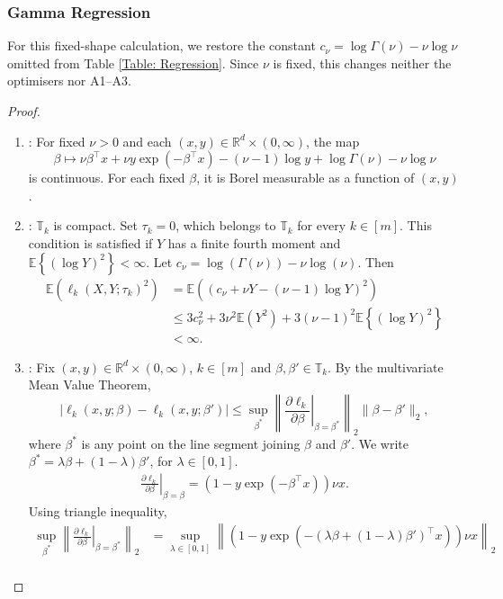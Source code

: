\documentclass[12pt]{article}
\newcommand{\blue}[1]{\textcolor[rgb]{0.00,0.00,1.00}{#1}}
\theoremstyle{remark}
\theoremstyle{plain}
\begin{document}
\subsubsection{Gamma Regression}
\blue{For this fixed-shape calculation, we restore the constant $c_\nu=\log\Gamma(\nu)-\nu\log\nu$ omitted from Table \ref{Table: Regression}. Since $\nu$ is fixed, this changes neither the optimisers nor A1--A3.}
\begin{proof}
    \begin{enumerate}
    \item[A1]: For fixed $\nu>0$ and each $(x,y)\in\mathbb R^d\times(0,\infty)$, the map
    \[
    \beta\mapsto \nu\beta^\top x+\nu y\exp(-\beta^\top x)
    -(\nu-1)\log y+\log\Gamma(\nu)-\nu\log\nu
    \]
    is continuous. For each fixed $\beta$, it is Borel measurable as a function of $(x,y)$.
    \item[A2]: $\mathbb{T}_k$ is compact. Set $\tau_k=0$, which belongs to $\mathbb{T}_k$ for every $k\in[m]$. This condition is satisfied if $Y$ has a finite fourth moment and $\mathbb{E}\left\{\left(\log Y\right)^2\right\} < \infty$. Let $c_\nu = \log(\Gamma(\nu)) - \nu\log(\nu)$. Then
    \begin{align*}
        \mathbb{E}\left(\ell_k(X, Y; \tau_k)^2\right) &= \mathbb{E}\left(\left(c_\nu + \nu Y - (\nu - 1)\log Y \right)^2\right)\\
        &\leq 3c_\nu^2 + 3\nu^2\mathbb{E}\left(Y^2\right) + 3(\nu - 1)^2\mathbb{E}\left\{\left(\log Y\right)^2\right\}\\
        &< \infty.
    \end{align*}
    \item[A3]: Fix \blue{$(x,y)\in \mathbb R^d\times(0,\infty)$}, $k \in \left[m\right]$ and $\beta, \beta'\in \mathbb{T}_k$. By the multivariate Mean Value Theorem,
    \[|\ell_k(x, y; \beta) - \ell_k(x, y; \beta')| \leq \sup_{\beta^*} \left\lVert \left. \frac{\partial \ell_k}{\partial \beta}\right|_{\beta = \beta^*} \right \rVert_2 \lVert \beta - \beta'\rVert_2, \]
    where $\beta^*$ is any point on the line segment joining $\beta$ and $\beta'$. We write $\beta^* = \lambda\beta + (1 - \lambda)\beta'$, for $\lambda\in\left[0, 1\right]$.
    \begin{align*}
        \left.\frac{\partial \ell_k}{\partial \beta}\right|_{\beta=\beta} = \left(1 - y\exp(-\beta^\top x)\right)\nu x.
    \end{align*}
    Using triangle inequality,
    \begin{align*}
        \sup_{\beta^*} \left\lVert \left. \frac{\partial \ell_k}{\partial \beta}\right|_{\beta = \beta^*} \right \rVert_2 &= \sup_{\lambda\in\left[0, 1\right]} \left\lVert \left(1 - y\exp\left(-(\lambda\beta + (1 - \lambda)\beta')^\top x\right)\right)\nu x\right\rVert_2\\

\end{align*}
\end{enumerate}
\end{proof}
\end{document}
